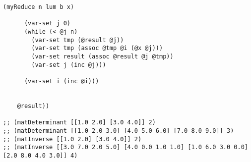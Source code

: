 \begin{center}
\begin{lstlisting}[label=lst:clojurehelloworld-4,caption=Нахождение обратной матрицы]
	  (myReduce n lum b x)

	  (var-set j 0)
	  (while (< @j n)
		(var-set tmp (@result @j))
		(var-set tmp (assoc @tmp @i (@x @j)))
		(var-set result (assoc @result @j @tmp))
		(var-set j (inc @j)))

	  (var-set i (inc @i)))


	@result))

;; (matDeterminant [[1.0 2.0] [3.0 4.0]] 2)
;; (matDeterminant [[1.0 2.0 3.0] [4.0 5.0 6.0] [7.0 8.0 9.0]] 3)
;; (matInverse [[1.0 2.0] [3.0 4.0]] 2)
;; (matInverse [[3.0 7.0 2.0 5.0] [4.0 0.0 1.0 1.0] [1.0 6.0 3.0 0.0] [2.0 8.0 4.0 3.0]] 4)
	\end{lstlisting}
\end{center}



%
%
%
%
%
